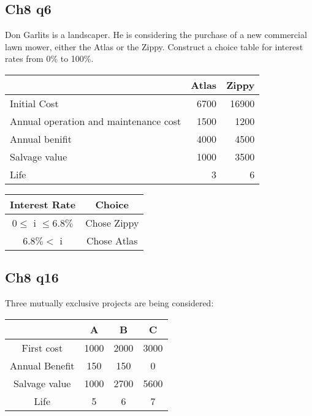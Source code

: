 \documentclass[12pt]{article}
\begin{document}
\subsection*{Ch8 q6}
Don Garlits is a landscaper. He is consid­ering the purchase of a new commercial lawn mower, either the Atlas or the Zippy. Construct a choice table for interest rates from 0\% to 100\%.

\begin{center}
    \begin{tabular}{p{5cm} r r}
        & \textbf{Atlas} & \textbf{Zippy}\\
        \hline
        Initial Cost & 6700 & 16900\\
        Annual operation and maintenance cost & 1500 & 1200\\
        Annual benifit & 4000 & 4500\\
        Salvage value & 1000 & 3500\\
        Life & 3 & 6\\
        \hline
    \end{tabular}
\end{center}

\begin{center}
    \begin{tabular}{c c }
        \textbf{Interest Rate} & \textbf{Choice}\\
        \hline
        $0\leq$ i $\leq 6.8\%$ & Chose Zippy\\
        $6.8\%<$ i & Chose Atlas\\
        \hline
    \end{tabular}
\end{center}


\subsection*{Ch8 q16}
Three mutually exclusive projects are being considered:
\begin{center}
    \begin{tabular}{c c c c}
        & \textbf{A}& \textbf{B}& \textbf{C}\\
        \hline
        First cost & 1000 & 2000 &3000\\
        Annual Benefit & 150 & 150 & 0\\
        Salvage value & 1000 & 2700 & 5600\\
        Life & 5 & 6 & 7\\
        \hline
    \end{tabular}
\end{center}
\end{document}
